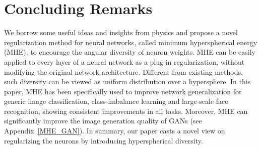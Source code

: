 \section{Concluding Remarks} 

We borrow some useful ideas and insights from physics and propose a novel regularization method for neural networks, called minimum hyperspherical energy (MHE), to encourage the angular diversity of neuron weights. MHE can be easily applied to every layer of a neural network as a plug-in regularization, without modifying the original network architecture. Different from existing methods, such diversity can be viewed as uniform distribution over a hypersphere. In this paper, MHE has been specifically used to improve network generalization for generic image classification, class-imbalance learning and large-scale face recognition, showing consistent improvements in all tasks. Moreover, MHE can significantly improve the image generation quality of GANs (see Appendix~\ref{MHE_GAN}). In summary, our paper casts a novel view on regularizing the neurons by introducing hyperspherical diversity.


